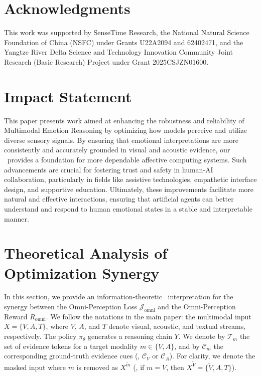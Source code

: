 \documentclass{article}
\theoremstyle{plain}
\theoremstyle{definition}
\theoremstyle{remark}
\begin{document}
\clearpage
\section*{Acknowledgments}

This work was supported by SenseTime Research, the National Natural Science Foundation of China (NSFC) under Grants U22A2094 and 62402471, and the Yangtze River Delta Science and Technology Innovation Community Joint Research (Basic Research) Project under Grant 2025CSJZN01600.


\section*{Impact Statement}
This paper presents work aimed at enhancing the robustness and reliability of Multimodal Emotion Reasoning by optimizing how models perceive and utilize diverse sensory signals. By ensuring that emotional interpretations are more consistently and accurately grounded in visual and acoustic evidence, our \ourmethod~provides a foundation for more dependable affective computing systems. Such advancements are crucial for fostering trust and safety in human-AI collaboration, particularly in fields like assistive technologies, empathetic interface design, and supportive education. Ultimately, these improvements facilitate more natural and effective interactions, ensuring that artificial agents can better understand and respond to human emotional states in a stable and interpretable manner.













\nocite{langley00}





\newpage
\appendix
\onecolumn

\section{Theoretical Analysis of Optimization Synergy}
\label{sec:theory}

In this section, we provide an information-theoretic~\cite{shannon1948mathematical} interpretation for the synergy between the Omni-Perception Loss $\mathcal{J}_{\mathrm{omni}}$ and the Omni-Perception Reward $R_{\mathrm{omni}}$. We follow the notations in the main paper: the multimodal input $X = \{V, A, T\}$, where $V$, $A$, and $T$ denote visual, acoustic, and textual streams, respectively. The policy $\pi_\theta$ generates a reasoning chain $Y$. We denote by $\mathcal{T}_{m}$ the set of evidence tokens for a target modality $m \in \{V, A\}$, and by $\mathcal{C}_{m}$ the corresponding ground-truth evidence cues (\eg, $\mathcal{C}_V$ or $\mathcal{C}_A$). For clarity, we denote the masked input where $m$ is removed as $X^{\tilde{m}}$ (\eg, if $m = V$, then $X^{\tilde V} = \{\tilde V, A, T\}$).
\end{document}
